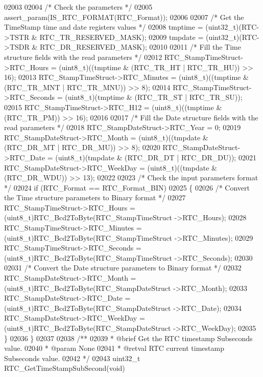 \begin{DoxyCode}
02003 
02004   \textcolor{comment}{/* Check the parameters */}
02005   assert_param(IS\_RTC\_FORMAT(RTC\_Format));
02006 
02007   \textcolor{comment}{/* Get the TimeStamp time and date registers values */}
02008   tmptime = (uint32\_t)(RTC->TSTR & RTC_TR_RESERVED_MASK);
02009   tmpdate = (uint32\_t)(RTC->TSDR & RTC_DR_RESERVED_MASK);
02010 
02011   \textcolor{comment}{/* Fill the Time structure fields with the read parameters */}
02012   RTC\_StampTimeStruct->RTC_Hours = (uint8\_t)((tmptime & (RTC_TR_HT | 
      RTC_TR_HU)) >> 16);
02013   RTC\_StampTimeStruct->RTC_Minutes = (uint8\_t)((tmptime & (RTC_TR_MNT | 
      RTC_TR_MNU)) >> 8);
02014   RTC\_StampTimeStruct->RTC_Seconds = (uint8\_t)(tmptime & (RTC_TR_ST | 
      RTC_TR_SU));
02015   RTC\_StampTimeStruct->RTC_H12 = (uint8\_t)((tmptime & (RTC_TR_PM)) >> 16);
02016 
02017   \textcolor{comment}{/* Fill the Date structure fields with the read parameters */}
02018   RTC\_StampDateStruct->RTC_Year = 0;
02019   RTC\_StampDateStruct->RTC_Month = (uint8\_t)((tmpdate & (RTC_DR_MT | 
      RTC_DR_MU)) >> 8);
02020   RTC\_StampDateStruct->RTC_Date = (uint8\_t)(tmpdate & (RTC_DR_DT | 
      RTC_DR_DU));
02021   RTC\_StampDateStruct->RTC_WeekDay = (uint8\_t)((tmpdate & (RTC_DR_WDU)) >> 13);
02022 
02023   \textcolor{comment}{/* Check the input parameters format */}
02024   \textcolor{keywordflow}{if} (RTC\_Format == RTC_Format_BIN)
02025   \{
02026     \textcolor{comment}{/* Convert the Time structure parameters to Binary format */}
02027     RTC\_StampTimeStruct->RTC_Hours = (uint8\_t)RTC_Bcd2ToByte(RTC\_StampTimeStruct
      ->RTC_Hours);
02028     RTC\_StampTimeStruct->RTC_Minutes = (uint8\_t)RTC_Bcd2ToByte(RTC\_StampTimeStruct
      ->RTC_Minutes);
02029     RTC\_StampTimeStruct->RTC_Seconds = (uint8\_t)RTC_Bcd2ToByte(RTC\_StampTimeStruct
      ->RTC_Seconds);
02030 
02031     \textcolor{comment}{/* Convert the Date structure parameters to Binary format */}
02032     RTC\_StampDateStruct->RTC_Month = (uint8\_t)RTC_Bcd2ToByte(RTC\_StampDateStruct
      ->RTC_Month);
02033     RTC\_StampDateStruct->RTC_Date = (uint8\_t)RTC_Bcd2ToByte(RTC\_StampDateStruct
      ->RTC_Date);
02034     RTC\_StampDateStruct->RTC_WeekDay = (uint8\_t)RTC_Bcd2ToByte(RTC\_StampDateStruct
      ->RTC_WeekDay);
02035   \}
02036 \}
02037 
02038 \textcolor{comment}{/**}
02039 \textcolor{comment}{  * @brief  Get the RTC timestamp Subseconds value.}
02040 \textcolor{comment}{  * @param  None}
02041 \textcolor{comment}{  * @retval RTC current timestamp Subseconds value.}
02042 \textcolor{comment}{  */}
02043 uint32\_t RTC_GetTimeStampSubSecond(\textcolor{keywordtype}{void})

\end{DoxyCode}
